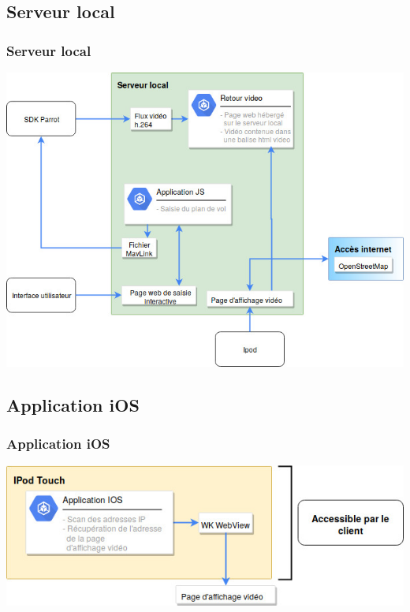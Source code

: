 \documentclass{beamer}
\begin{document}
	
	
	\begin{frame}
		\section{Serveur local}
		\begin{center}
		\frametitle{Serveur local}
        \includegraphics[scale=0.4]{Architecture_logicielle_composants/Serveur.jpg}
		\end{center}
	\end{frame}
	
	
	
	\begin{frame}
		\section{Application iOS}
		\begin{center}
		\frametitle{Application iOS}
        \includegraphics[scale=0.5]{Architecture_logicielle_composants/ios_app.jpg}
		\end{center}
	\end{frame}
	
\end{document}
